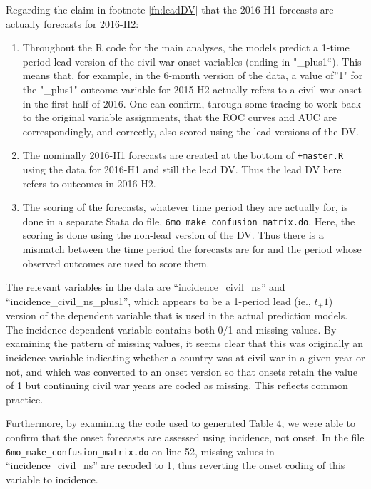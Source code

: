 \documentclass[
]{article}
\providecommand{\tightlist}{%
  \setlength{\itemsep}{0pt}\setlength{\parskip}{0pt}}
\begin{document}
Regarding the claim in footnote \ref{fn:leadDV} that the 2016-H1 forecasts are actually forecasts for 2016-H2:

\begin{enumerate}
\def\labelenumi{\arabic{enumi}.}
\tightlist
\item
  Throughout the R code for the main analyses, the models predict a 1-time period lead version of the civil war onset variables (ending in "\_plus1``). This means that, for example, in the 6-month version of the data, a value of''1" for the "\_plus1" outcome variable for 2015-H2 actually refers to a civil war onset in the first half of 2016. One can confirm, through some tracing to work back to the original variable assignments, that the ROC curves and AUC are correspondingly, and correctly, also scored using the lead versions of the DV.
\item
  The nominally 2016-H1 forecasts are created at the bottom of \texttt{+master.R} using the data for 2016-H1 and still the lead DV. Thus the lead DV here refers to outcomes in 2016-H2.
\item
  The scoring of the forecasts, whatever time period they are actually for, is done in a separate Stata do file, \texttt{6mo\_make\_confusion\_matrix.do}. Here, the scoring is done using the non-lead version of the DV. Thus there is a mismatch between the time period the forecasts are for and the period whose observed outcomes are used to score them.
\end{enumerate}

The relevant variables in the data are ``incidence\_civil\_ns'' and ``incidence\_civil\_ns\_plus1'', which appears to be a 1-period lead (ie., \(t_+1\)) version of the dependent variable that is used in the actual prediction models. The incidence dependent variable contains both 0/1 and missing values. By examining the pattern of missing values, it seems clear that this was originally an incidence variable indicating whether a country was at civil war in a given year or not, and which was converted to an onset version so that onsets retain the value of 1 but continuing civil war years are coded as missing. This reflects common practice.

Furthermore, by examining the code used to generated Table 4, we were able to confirm that the onset forecasts are assessed using incidence, not onset. In the file \texttt{6mo\_make\_confusion\_matrix.do} on line 52, missing values in ``incidence\_civil\_ns'' are recoded to 1, thus reverting the onset coding of this variable to incidence.
\end{document}
